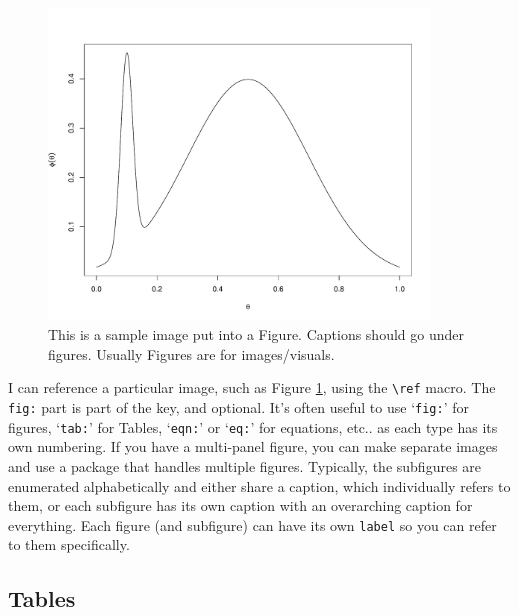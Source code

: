 \documentclass[12pt]{article}
\begin{document}
\begin{center}
\begin{figure}
	\includegraphics[width=0.9\textwidth]{Rplot}
	\caption{\label{fig:sampleimage1} This is a sample image put into a Figure. Captions should go under figures. Usually Figures are for images/visuals.}
\end{figure}
\end{center}

I can reference a particular image, such as Figure \ref{fig:sampleimage1}, using the \verb|\ref| macro. The \texttt{fig:} part is part of the key, and optional. It's often useful to use `\texttt{fig:}' for figures, `\texttt{tab:}' for Tables, `\texttt{eqn:}' or `\texttt{eq:}' for equations, etc.. as each type has its own numbering. If you have a multi-panel figure, you can make separate images and use a package that handles multiple figures. Typically, the subfigures are enumerated alphabetically and either share a caption, which individually refers to them, or each subfigure has its own caption with an overarching caption for everything. Each figure (and subfigure) can have its own \texttt{label} so you can refer to them specifically.


\subsection {Tables}
	 
\end{document}
